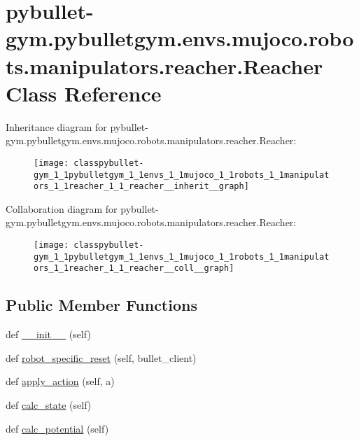 \hypertarget{classpybullet-gym_1_1pybulletgym_1_1envs_1_1mujoco_1_1robots_1_1manipulators_1_1reacher_1_1_reacher}{}\section{pybullet-\/gym.pybulletgym.\+envs.\+mujoco.\+robots.\+manipulators.\+reacher.\+Reacher Class Reference}
\label{classpybullet-gym_1_1pybulletgym_1_1envs_1_1mujoco_1_1robots_1_1manipulators_1_1reacher_1_1_reacher}


Inheritance diagram for pybullet-\/gym.pybulletgym.\+envs.\+mujoco.\+robots.\+manipulators.\+reacher.\+Reacher\+:
\nopagebreak
\begin{figure}[H]
\begin{center}
\leavevmode
\texttt{[image: classpybullet-gym\_1\_1pybulletgym\_1\_1envs\_1\_1mujoco\_1\_1robots\_1\_1manipulators\_1\_1reacher\_1\_1\_reacher\_\_inherit\_\_graph]}
\end{center}
\end{figure}


Collaboration diagram for pybullet-\/gym.pybulletgym.\+envs.\+mujoco.\+robots.\+manipulators.\+reacher.\+Reacher\+:
\nopagebreak
\begin{figure}[H]
\begin{center}
\leavevmode
\texttt{[image: classpybullet-gym\_1\_1pybulletgym\_1\_1envs\_1\_1mujoco\_1\_1robots\_1\_1manipulators\_1\_1reacher\_1\_1\_reacher\_\_coll\_\_graph]}
\end{center}
\end{figure}
\subsection*{Public Member Functions}
\begin{DoxyCompactItemize}
\item 
def \hyperlink{classpybullet-gym_1_1pybulletgym_1_1envs_1_1mujoco_1_1robots_1_1manipulators_1_1reacher_1_1_reacher_adf6b43a702859ebf98ee9f13baf95eaa}{\+\_\+\+\_\+init\+\_\+\+\_\+} (self)
\item 
def \hyperlink{classpybullet-gym_1_1pybulletgym_1_1envs_1_1mujoco_1_1robots_1_1manipulators_1_1reacher_1_1_reacher_a0a96e419e1882045620d96bb6b8f7380}{robot\+\_\+specific\+\_\+reset} (self, bullet\+\_\+client)
\item 
def \hyperlink{classpybullet-gym_1_1pybulletgym_1_1envs_1_1mujoco_1_1robots_1_1manipulators_1_1reacher_1_1_reacher_a1ca4d79f365e8b8581d96b846669e5d1}{apply\+\_\+action} (self, a)
\item 
def \hyperlink{classpybullet-gym_1_1pybulletgym_1_1envs_1_1mujoco_1_1robots_1_1manipulators_1_1reacher_1_1_reacher_afef49916cc380b6cf78ca72e03cd8138}{calc\+\_\+state} (self)
\item 
def \hyperlink{classpybullet-gym_1_1pybulletgym_1_1envs_1_1mujoco_1_1robots_1_1manipulators_1_1reacher_1_1_reacher_a03bff6d83aa99e4bdf87bb0dc350dbd2}{calc\+\_\+potential} (self)
\end{DoxyCompactItemize}
